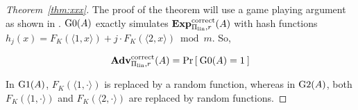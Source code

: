 \begin{proof}[Theorem~\ref{thm:xxx}]
The proof of the theorem will use a game playing argument as shown in . $\text{G0}(A)$ exactly simulates $\mathrm{\mathbf{Exp}}^{\mathrm{correct}}_{\Pi_\mathrm{lin},r}(A)$ with hash functions $h_j(x) =  F_{K}(\langle 1,x \rangle) + j\cdot F_{K}(\langle 2,x \rangle) \bmod m$. So,

\begin{equation}
\mathrm{\mathbf{Adv}}^{\mathrm{correct}}_{\Pi_{\mathrm{lin}},r}(A) = \Pr\left[\: \text{G0}(A)=1 \:\right]\label{eq:0}
\end{equation}

 In $\text{G1}(A)$, $F_{K}(\langle 1,\cdot \rangle)$ is replaced by a random function, whereas in $\text{G2}(A)$, both $F_{K}(\langle 1,\cdot \rangle)$ and $F_{K}(\langle 2, \cdot \rangle)$ are replaced by random functions.


\end{proof}
